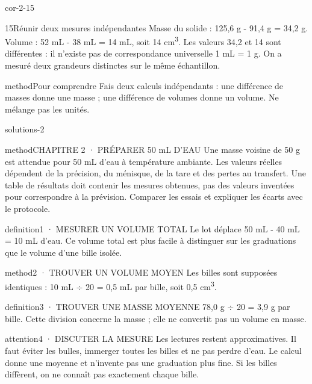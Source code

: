 \documentclass[12pt,twoside,openany]{book}
\begin{document}
\begin{blocLivre}{cor-2-15}
\begin{corrige}{15}{Réunir deux mesures indépendantes}
Masse du solide : 125,6 g - 91,4 g = 34,2 g. Volume : 52 mL - 38 mL = 14 mL, soit 14 cm\textsuperscript{3}. Les valeurs 34,2 et 14 sont différentes : il n’existe pas de correspondance universelle 1 mL = 1 g. On a mesuré deux grandeurs distinctes sur le même échantillon.\par
\begin{pcEncadre}{method}{Pour comprendre}
Fais deux calculs indépendants : une différence de masses donne une masse ; une différence de volumes donne un volume. Ne mélange pas les unités.\par
\end{pcEncadre}
\end{corrige}\end{blocLivre}
\label{solutions-2}
\begin{pcFiche}{solutions-2}
\begin{pcEncadre}{method}{CHAPITRE 2 · PRÉPARER 50 mL D’EAU}
Une masse voisine de 50 g est attendue pour 50 mL d’eau à température ambiante. Les valeurs réelles dépendent de la précision, du ménisque, de la tare et des pertes au transfert. Une table de résultats doit contenir les mesures obtenues, pas des valeurs inventées pour correspondre à la prévision. Comparer les essais et expliquer les écarts avec le protocole.\par
\end{pcEncadre}
\label{defi-cor-2}
\begin{pcEncadre}{definition}{1 · MESURER UN VOLUME TOTAL}
Le lot déplace 50 mL - 40 mL = 10 mL d’eau. Ce volume total est plus facile à distinguer sur les graduations que le volume d’une bille isolée.\par
\end{pcEncadre}
\begin{pcEncadre}{method}{2 · TROUVER UN VOLUME MOYEN}
Les billes sont supposées identiques : 10 mL \(\div\) 20 = 0,5 mL par bille, soit 0,5 cm\textsuperscript{3}.\par
\end{pcEncadre}
\begin{pcEncadre}{definition}{3 · TROUVER UNE MASSE MOYENNE}
78,0 g \(\div\) 20 = 3,9 g par bille. Cette division concerne la masse ; elle ne convertit pas un volume en masse.\par
\end{pcEncadre}
\begin{pcEncadre}{attention}{4 · DISCUTER LA MESURE}
Les lectures restent approximatives. Il faut éviter les bulles, immerger toutes les billes et ne pas perdre d’eau. Le calcul donne une moyenne et n’invente pas une graduation plus fine. Si les billes diffèrent, on ne connaît pas exactement chaque bille.\par
\end{pcEncadre}
\end{pcFiche}
\end{document}
